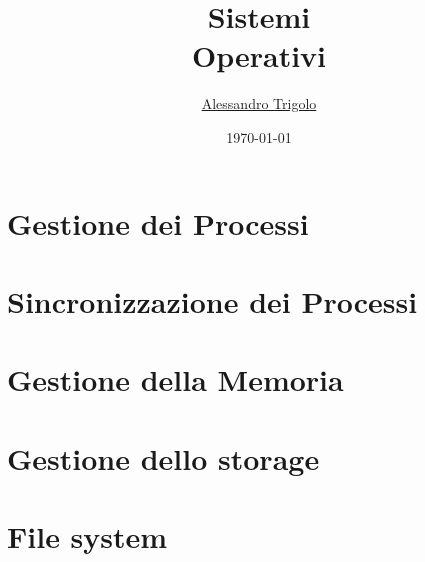 \documentclass[titlepage]{article}
\title{\textbf{\fontsize{35pt}{35pt}\selectfont Sistemi\\\vspace{25pt}Operativi}}
\author{\Large{\href{https://github.com/imAlessas}{Alessandro Trigolo}}}
\date{\today}
\begin{document}
\maketitle

\newpage\tableofcontents

\newpage\listoffigures

\newpage\lstlistoflistings

\lstset{style = C++}





\newpage\part{Gestione dei Processi}











\newpage\part{Sincronizzazione dei Processi}









\newpage\part{Gestione della Memoria}









\newpage\part{Gestione dello storage}









\newpage\part{File system}




\end{document}
